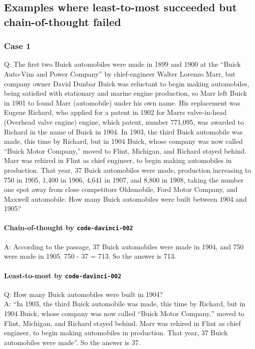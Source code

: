 \subsection{Examples where least-to-most succeeded but chain-of-thought failed}
\label{app:drop-example}

\subsubsection{Case 1}
Q: The first two Buick automobiles were made in 1899 and 1900 at the ``Buick Auto-Vim and Power Company'' by chief-engineer Walter Lorenzo Marr, but company owner David Dunbar Buick was reluctant to begin making automobiles, being satisfied with stationary and marine engine production, so Marr left Buick in 1901 to found Marr (automobile) under his own name. His replacement was Eugene Richard, who applied for a patent in 1902 for Marrs valve-in-head (Overhead valve engine) engine, which patent, number 771,095, was awarded to Richard in the name of Buick in 1904. In 1903, the third Buick automobile was made, this time by Richard, but in 1904 Buick, whose company was now called ``Buick Motor Company,'' moved to Flint, Michigan, and Richard stayed behind. Marr was rehired in Flint as chief engineer, to begin making automobiles in production. That year, 37 Buick automobiles were made, production increasing to 750 in 1905, 1,400 in 1906, 4,641 in 1907, and 8,800 in 1908, taking the number one spot away from close competitors Oldsmobile, Ford Motor Company, and Maxwell automobile. How many Buick automobiles were built between 1904 and 1905?

\paragraph{Chain-of-thought by \texttt{code-davinci-002}}
A: According to the passage, 37 Buick automobiles were made in 1904, and 750 were made in 1905. 750 - 37 = 713. So the answer is 713.

\paragraph{Least-to-most by \texttt{code-davinci-002}}
Q: How many Buick automobiles were built in 1904?\\
A: ``In 1903, the third Buick automobile was made, this time by Richard, but in 1904 Buick, whose company was now called ``Buick Motor Company,'' moved to Flint, Michigan, and Richard stayed behind. Marr was rehired in Flint as chief engineer, to begin making automobiles in production. That year, 37 Buick automobiles were made''. So the answer is 37.

